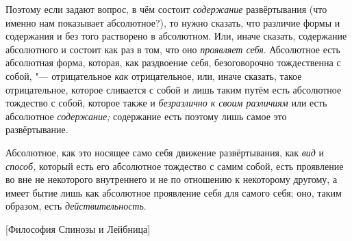 Поэтому если задают вопрос, в чём состоит
{\em содержание} развёртывания (что именно нам
показывает абсолютное?), то нужно сказать, что различие формы и содержания
и без того растворено в абсолютном. Или, иначе сказать, содержание
абсолютного и состоит как раз в том, что оно
{\em проявляет себя}. Абсолютное есть абсолютная форма,
которая, как раздвоение себя, безоговорочно тождественна с собой, "---
отрицательное {\em как} отрицательное, или, иначе
сказать, такое отрицательное, которое сливается с собой и лишь таким путём
есть абсолютное тождество с собой, которое также и
{\em безразлично к своим различиям} или есть абсолютное
{\em содержание;} содержание есть поэтому лишь самое это развёртывание.

Абсолютное, как это носящее само себя движение развёртывания, как
{\em вид} и {\em способ,} который
есть его абсолютное тождество с самим собой, есть проявление во вне не
некоторого внутреннего и не по отношению к некоторому другому, а имеет
бытие лишь как абсолютное проявление себя для самого себя; оно, таким
образом, есть {\em действительность}.

%
  {[Философия Спинозы и Лейбница]}

